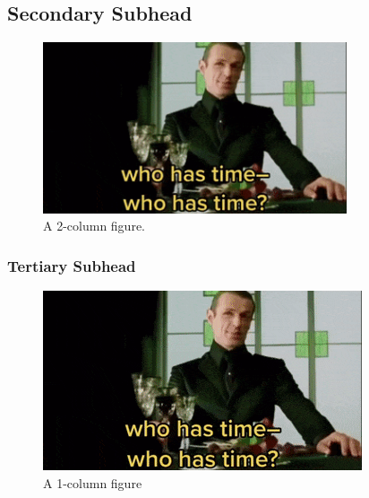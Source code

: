 \documentclass[11pt, twocolumn]{asaproc}
\begin{document}
\subsection{Secondary Subhead}

\begin{figure}[htb]
\centering\includegraphics[width = 0.8\textwidth]{matrix.png}
\caption{A 2-column figure.}
\end{figure}


\lipsum[1]

\subsubsection{Tertiary Subhead}


\lipsum[1]



\lipsum[1]

\begin{figure}[htb]
\centering\includegraphics[width = \columnwidth]{matrix.png}
\caption{A 1-column figure}
\end{figure}

\lipsum[1]
\end{document}
